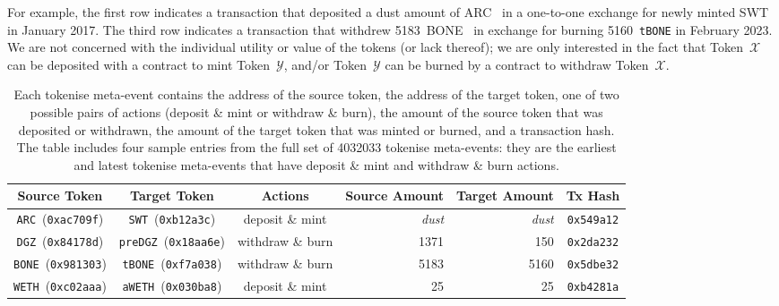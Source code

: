 For example, the first row indicates a transaction that deposited a
dust amount of ARC~\cite{arcade-city-xx} in a one-to-one exchange for
newly minted SWT~\cite{swarm-city-xx} in January 2017.  The third row
indicates a transaction that withdrew
\num{5183}~{BONE}~\cite{shiba-inu-xx} in exchange for burning
\num{5160}~\texttt{tBONE} in February 2023.  We are not concerned with
the individual utility or value of the tokens (or lack thereof); we
are only interested in the fact that Token~$\mathcal{X}$ can be
deposited with a contract to mint Token~$\mathcal{Y}$, and/or
Token~$\mathcal{Y}$ can be burned by a contract to withdraw
Token~$\mathcal{X}$.

\begin{table*}
  \centering
  \caption{Each tokenise meta-event contains the address of the source
    token, the address of the target token, one of two possible pairs
    of actions (deposit \& mint or withdraw \& burn), the amount of
    the source token that was deposited or withdrawn, the amount of
    the target token that was minted or burned, and a transaction
    hash.  The table includes four sample entries from the full set of
    \num{4032033} tokenise meta-events: they are the earliest and
    latest tokenise meta-events that have deposit \& mint and withdraw
    \& burn actions.}\label{tab:meta-events}
  \begin{tabular}{|c|c|c|r|r|c|}
    \hline
    Source Token &
    Target Token &
    Actions &
    Source Amount &
    Target Amount &
    Tx Hash\\
    \hline

    \texttt{ARC}~(\texttt{0xac709f}) &
    \texttt{SWT}~(\texttt{0xb12a3c}) & deposit \& mint & \textit{dust}
    & \textit{dust} & \texttt{0x549a12}\\

    \texttt{DGZ}~(\texttt{0x84178d}) &
    \texttt{preDGZ}~(\texttt{0x18aa6e}) & withdraw \& burn &
    \num{1371} & \num{150} & \texttt{0x2da232}\\

    \texttt{BONE}~(\texttt{0x981303}) &
    \texttt{tBONE}~(\texttt{0xf7a038}) & withdraw \& burn & \num{5183}
    & \num{5160} & \texttt{0x5dbe32}\\

    \texttt{WETH}~(\texttt{0xc02aaa}) &
    \texttt{aWETH}~(\texttt{0x030ba8}) & deposit \& mint & \num{25} &
    \num{25} & \texttt{0xb4281a}\\

    \hline
  \end{tabular}
\end{table*}

